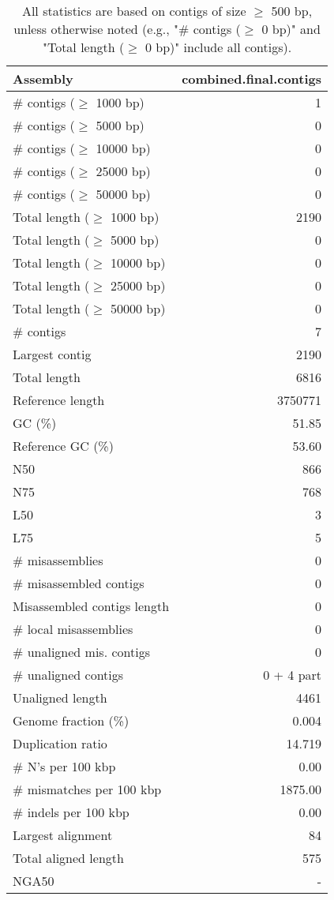 \documentclass[12pt,a4paper]{article}
\begin{document}
\begin{table}[ht]
\begin{center}
\caption{All statistics are based on contigs of size $\geq$ 500 bp, unless otherwise noted (e.g., "\# contigs ($\geq$ 0 bp)" and "Total length ($\geq$ 0 bp)" include all contigs).}
\begin{tabular}{|l*{1}{|r}|}
\hline
Assembly & combined.final.contigs \\ \hline
\# contigs ($\geq$ 1000 bp) & 1 \\ \hline
\# contigs ($\geq$ 5000 bp) & 0 \\ \hline
\# contigs ($\geq$ 10000 bp) & 0 \\ \hline
\# contigs ($\geq$ 25000 bp) & 0 \\ \hline
\# contigs ($\geq$ 50000 bp) & 0 \\ \hline
Total length ($\geq$ 1000 bp) & 2190 \\ \hline
Total length ($\geq$ 5000 bp) & 0 \\ \hline
Total length ($\geq$ 10000 bp) & 0 \\ \hline
Total length ($\geq$ 25000 bp) & 0 \\ \hline
Total length ($\geq$ 50000 bp) & 0 \\ \hline
\# contigs & 7 \\ \hline
Largest contig & 2190 \\ \hline
Total length & 6816 \\ \hline
Reference length & 3750771 \\ \hline
GC (\%) & 51.85 \\ \hline
Reference GC (\%) & 53.60 \\ \hline
N50 & 866 \\ \hline
N75 & 768 \\ \hline
L50 & 3 \\ \hline
L75 & 5 \\ \hline
\# misassemblies & 0 \\ \hline
\# misassembled contigs & 0 \\ \hline
Misassembled contigs length & 0 \\ \hline
\# local misassemblies & 0 \\ \hline
\# unaligned mis. contigs & 0 \\ \hline
\# unaligned contigs & 0 + 4 part \\ \hline
Unaligned length & 4461 \\ \hline
Genome fraction (\%) & 0.004 \\ \hline
Duplication ratio & 14.719 \\ \hline
\# N's per 100 kbp & 0.00 \\ \hline
\# mismatches per 100 kbp & 1875.00 \\ \hline
\# indels per 100 kbp & 0.00 \\ \hline
Largest alignment & 84 \\ \hline
Total aligned length & 575 \\ \hline
NGA50 & - \\ \hline
\end{tabular}
\end{center}
\end{table}
\end{document}
